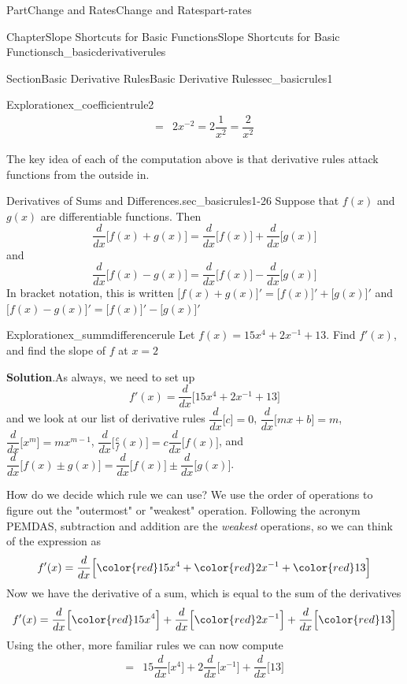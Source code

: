 \documentclass[oneside,10pt,]{tufte-book}
\newcommand{\blocktitlefont}{\relax}
\numberwithin{equation}{chapter}
\newcommand{\red}[1]{   {\color{red}   #1}   }
\newcommand{\ddx}[1]{ \dfrac{d}{dx} \Big[ #1 \Big]  }
\newcommand{\D}[1]{ \Big[ #1 \Big]'  }
\newcommand{\amp}{&}
\begin{document}
\begin{partptx}{Part}{Change and Rates}{}{Change and Rates}{}{}{part-rates}
\begin{chapterptx}{Chapter}{Slope Shortcuts for Basic Functions}{}{Slope Shortcuts for Basic Functions}{}{}{ch_basicderivativerules}
\begin{sectionptx}{Section}{Basic Derivative Rules}{}{Basic Derivative Rules}{}{}{sec_basicrules1}
\begin{exploration}{Exploration}{}{ex_coefficientrule2}
\begin{align*}
= \amp 2 { { x}^{-2 }  } = 2\dfrac{1}{x^2} = \dfrac{2}{x^2} 
\end{align*}
%
\end{exploration}%
The key idea of each of the computation above is that derivative rules attack functions from the outside in.%
\begin{paragraphs}{Derivatives of Sums and Differences.}{sec_basicrules1-26}%
Suppose that \(f(x)\) and \(g(x)\) are differentiable functions.  Then%
\begin{equation*}
\ddx{ f(x) + g(x) } = \ddx{f(x)} + \ddx{g(x)}
\end{equation*}
and%
\begin{equation*}
\ddx{f(x) - g(x) } = \ddx{f(x) } - \ddx{g(x)}
\end{equation*}
In bracket notation, this is written \(\D{f(x) + g(x)} = \D{f(x)} + \D{g(x)} \) and \(\D{f(x) - g(x)} = \D{f(x)} - \D{g(x)} \)%
\end{paragraphs}%
\begin{exploration}{Exploration}{}{ex_summdifferencerule}%
Let \(f(x) = 15x^4 + 2x^{-1} + 13\). Find \(f'(x)\), and find the slope of \(f\) at \(x=2\)%
\par\smallskip%
\noindent\textbf{\blocktitlefont Solution}.\hypertarget{ex_summdifferencerule-2}{}\quad{}As always, we need to set up%
\begin{equation*}
f'(x) = \ddx{ 15x^4 + 2x^{-1} + 13 }
\end{equation*}
and we look at our list of derivative rules \(\ddx{c}=0\), \(\ddx{mx+b}=m\), \(\ddx{x^m}=mx^{m-1}\),  \(\ddx{\frac cf(x)}=c\ddx{f(x)}\), and \(\ddx{f(x) \pm g(x)} = \ddx{f(x)} \pm \ddx{g(x)}\).%
\par
How do we decide which rule we can use? We use the order of operations to figure out the "outermost" or "weakest" operation. Following the acronym PEMDAS, subtraction and addition are the \emph{weakest} operations, so we can think of the expression as%
\begin{equation*}
f'(x) = \ddx{ \red{15x^4} + \red{2x^{-1}} + \red{13} }
\end{equation*}
Now we have the derivative of a sum, which is equal to the sum of the derivatives%
\begin{equation*}
f'(x) = \ddx{ \red{15x^4} } + \ddx{ \red{2x^{-1} } } + \ddx{\red{13}} 
\end{equation*}
Using the other, more familiar rules we can now compute%
\begin{align*}
= \amp 15\ddx{x^4} + 2\ddx{x^{-1}} + \ddx{13}\\

\end{align*}
\end{exploration}
\end{sectionptx}
\end{chapterptx}
\end{partptx}
\end{document}
